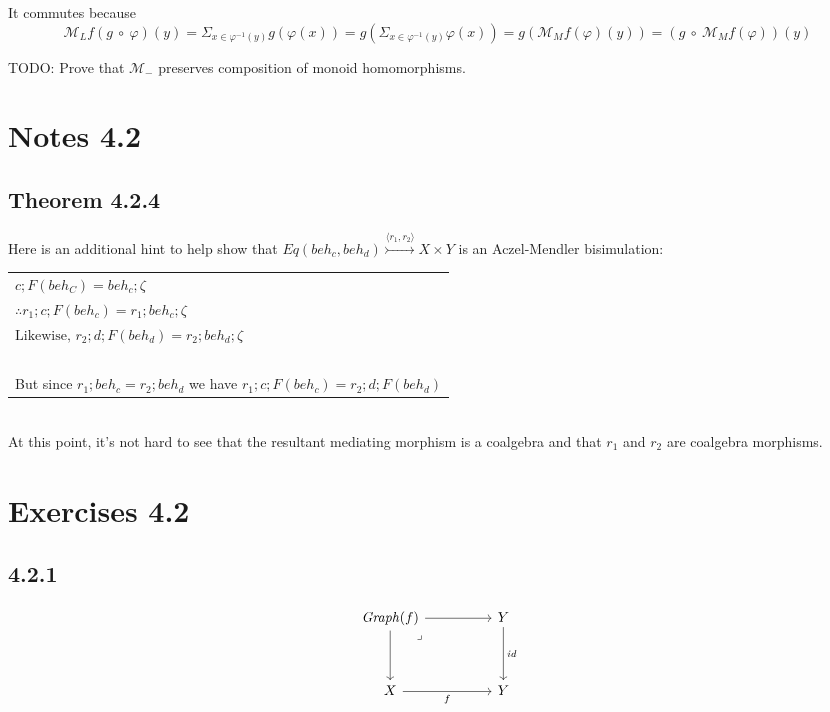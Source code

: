 \documentclass{article}
\begin{document}
It commutes because 
$$\mathcal M_L f (g~\circ~\varphi)(y) = \Sigma_{x \in \varphi^{-1}(y)} g(\varphi(x)) = g(\Sigma_{x \in \varphi^{-1}(y)} \varphi(x)) = g(\mathcal M_M f(\varphi)(y)) = (g~\circ~\mathcal M_M f(\varphi))(y)$$

TODO: Prove that $\mathcal M_{-}$ preserves composition of monoid homomorphisms.

\section*{Notes 4.2}

\subsection*{Theorem 4.2.4}

Here is an additional hint to help show that $\mathit{Eq}(\mathit{beh}_c, \mathit{beh}_d) \overset{\langle r_1, r_2 \rangle}{\rightarrowtail} X \times Y$ is an Aczel-Mendler bisimulation:
\begin{center}
\begin{tabular}{l}
$c;F(\mathit{beh}_C) = \mathit{beh}_{c};\zeta$ \\
$\therefore r_1;c;F(\mathit{beh}_c) = r_1;\mathit{beh}_{c};\zeta$ \\
$\text{Likewise, } r_2;d;F(\mathit{beh}_d) = r_2;\mathit{beh}_d;\zeta$ \\~\\
But since $r_1;\mathit{beh}_c = r_2;\mathit{beh}_d$ we have $r_1;c;F(\mathit{beh}_c) = r_2;d;F(\mathit{beh}_d)$
\end{tabular}
\end{center}~\\
At this point, it's not hard to see that the resultant mediating morphism is a coalgebra and that $r_1$ and
$r_2$ are coalgebra morphisms. 

\section*{Exercises 4.2}

\subsection*{4.2.1}

\[\begin{tikzcd}
	{\mathit{Graph}(f)} && Y \\
	\\
	X && Y
	\arrow["f"', from=3-1, to=3-3]
	\arrow[from=1-1, to=3-1]
	\arrow[from=1-1, to=1-3]
	\arrow["\lrcorner"{anchor=center, pos=0.125}, draw=none, from=1-1, to=3-3]
	\arrow["{\mathit{id}}", from=1-3, to=3-3]
\end{tikzcd}\]
\end{document}
